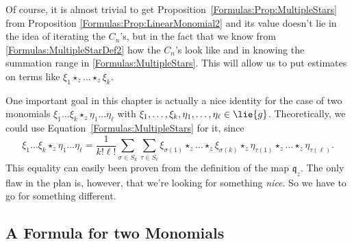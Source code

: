 \begin{remark}
	\mbox{}
	\begin{remarklist}
		\item
		Of course, it is almost trivial to get 
		Proposition~\ref{Formulas:Prop:MultipleStars} from Proposition 
		\ref{Formulas:Prop:LinearMonomial2} and its value doesn't lie in the 
		idea of iterating the $C_n$'s, but in the fact that we know from 
		\eqref{Formulas:MultipleStarDef2} how the $C_n$'s look like and in 
		knowing the summation range in \eqref{Formulas:MultipleStars}. This 
		will allow us to put estimates on terms like 
		$\xi_1 \star_z \ldots \star_z \xi_k$.
		
		\item
		One important goal in this chapter is actually a nice identity for the 
		case of two monomials $\xi_1 \ldots \xi_k \star_z \eta_1 \ldots 
		\eta_{\ell}$ with $\xi_1, \ldots, \xi_k, \eta_1, \ldots, \eta_{\ell} 
		\in \lie{g}$. Theoretically, we could use 
		Equation~\eqref{Formulas:MultipleStars} for it, since
		\begin{equation}
			\label{Formulas:2MonomialsWeird}
			\xi_1 \ldots \xi_k \star_z \eta_1 \ldots \eta_{\ell}
			=
			\frac{1}{k! \ell!}
			\sum\limits_{\sigma \in S_k}
			\sum\limits_{\tau \in S_{\ell}}
			\xi_{\sigma(1)} \star_z \ldots \star_z \xi_{\sigma(k)}
			\star_z
			\eta_{\tau(1)} \star_z \ldots \star_z \eta_{\tau(\ell)}.
		\end{equation}
		This equality can easily been proven from the definition of the map 
		$\mathfrak{q}_z$. The only flaw in the plan is, however, that we're 
		looking 	for something \emph{nice}. So we have to go for something 
		different.
	\end{remarklist}
\end{remark}



%

\subsection{A Formula for two Monomials}

